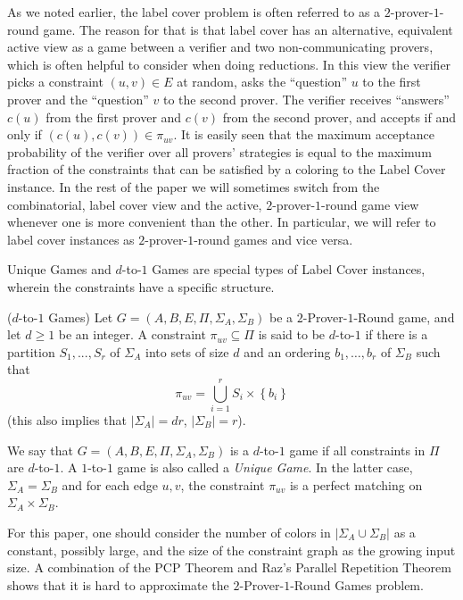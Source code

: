 \documentclass{toc}
\newcommand\card[1]{\left| {#1} \right|}
\newcommand\set[1]{{\left\{ #1 \right\}}}
\begin{document}
As we noted earlier, the label cover problem is often referred to as a $2$-prover-$1$-round game.
The reason for that is that label cover has an alternative, equivalent active view as a game between
a verifier and two non-communicating provers, which is often helpful to consider when doing reductions.
In this view the verifier picks a constraint
$(u,v)\in E$ at random, asks the ``question'' $u$ to the first prover and
the ``question'' $v$ to the second prover. The verifier receives ``answers''
$c(u)$ from the first prover and $c(v)$ from the second prover, and accepts if and only if
$(c(u), c(v)) \in \pi_{uv}$. It is easily seen that the maximum acceptance probability of the
verifier over all provers' strategies is equal to the maximum
fraction of the constraints that can be satisfied by a coloring to the
Label Cover instance. In the rest of the paper we will sometimes switch from the combinatorial,
label cover view and the active, $2$-prover-$1$-round game view whenever one is more convenient than
the other. In particular, we will refer to label cover
instances as $2$-prover-$1$-round games and vice versa.

Unique Games and $d$-to-$1$ Games are special types of Label Cover instances, 
wherein the constraints have a specific structure.
\begin{definition}($d$-to-$1$ Games) Let $G=(A,B,E,\Pi,\Sigma_A,\Sigma_B)$ be a
  $2$-Prover-$1$-Round game, and
    let $d \geqslant 1$ be an integer. A constraint
  $\pi_{uv} \subseteq \Pi$ is said to be
  $d$-to-$1$  if there is a partition $S_1,...,S_r$ of
  $\Sigma_A$ into sets of size $d$ and an ordering $b_1,\ldots,b_r$ of\/
  $\Sigma_B$  such that
\[
\pi_{uv}=\bigcup\limits_{i=1}^r{S_i\times \set{b_i}}
\]
 (this also implies that $|\Sigma_A| = dr$, $\card{\Sigma_B}=r$).

We say that  $G=(A,B,E,\Pi,\Sigma_A,\Sigma_B)$ is  a $d$-to-$1$
game if all constraints in $\Pi$ are $d$-to-$1$.
A $1$-to-$1$ game is also called a {\em Unique Game}. In the latter case,
$\Sigma_A = \Sigma_B$ and for each edge $u,v$, the constraint $\pi_{uv}$ is  a perfect matching on $\Sigma_A \times \Sigma_B$.
\end{definition}

For this paper, one should consider the number of colors in  $|\Sigma_A\cup\Sigma_B|$ as a constant, possibly large,  and the
size of the constraint graph as the growing input size. A combination of the PCP Theorem \cite{FGLSS96, AS98, ALMSS98} and
Raz's Parallel Repetition Theorem \cite{Raz98} shows that it is hard
to approximate the  $2$-Prover-$1$-Round Games problem.
\end{document}
